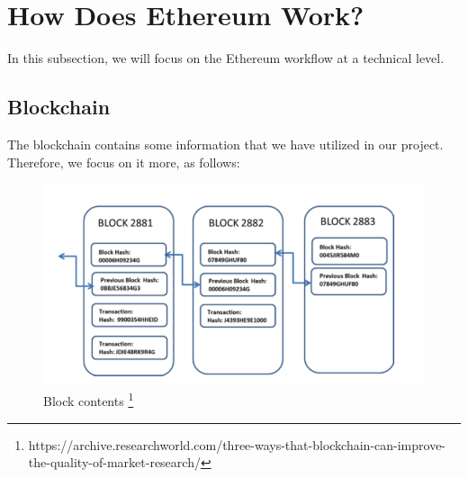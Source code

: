 \section{How Does Ethereum Work?}
In this subsection, we will focus on the Ethereum workflow at a technical level.
\subsection{Blockchain}
The blockchain contains some information that we have utilized in our project. Therefore, we focus on it more, as follows:
\begin{center}
	\begin{figure}[htb!]
		
		\begin{minipage}{0.5\linewidth}
			\centering
			\includegraphics[width=1.95\textwidth]{images/chap01_Blockchain.png}
		\end{minipage}
		\caption[Block contents]{Block contents \footnote{https://archive.researchworld.com/three-ways-that-blockchain-can-improve-the-quality-of-market-research/}}
		
	\end{figure}
	
\end{center}
